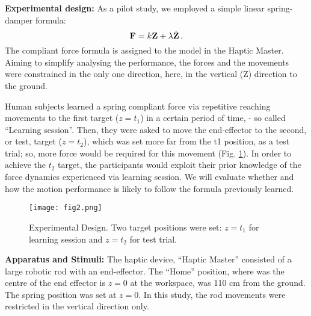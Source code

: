 
\textbf{Experimental design:} As a pilot study, we employed a simple linear spring-damper formula:
%
\begin{equation}
\mathbf{F} = k \mathbf{Z} + \lambda \dot{\mathbf{Z}} \, .
\end{equation}
%
The compliant force formula is assigned to the model in the Haptic Master. Aiming to simplify analysing the performance, the forces and the movements were constrained in the only one direction, here, in the vertical
(Z) direction to the ground.

Human subjects learned a spring compliant force via repetitive reaching movements to the first target ($z = t_1$) in a certain period of time, - so called ``Learning session''. Then, they were asked to move the end-effector to the second, or test, target ($z = t_2$), which was set more far from the t1 position, as a test trial; so, more force would be required for this movement (Fig. \ref*{design}). In order to achieve the $t_2$ target, the participants would exploit their prior knowledge of the force dynamics experienced via learning session. We will evaluate whether and how the motion performance is likely to follow the formula previously learned.
%
\begin{figure}
	\centering
	\texttt{[image: fig2.png]}
	\caption{Experimental Design. Two target positions were set: $z = t_1$ for learning session and $z = t_2$ for test trial.}
	\label{design}
\end{figure}



\textbf{Apparatus and Stimuli:} The haptic device, ``Haptic Master'' consisted of a large robotic rod with an end-effector. The ``Home'' position, where was the centre of the end effector is $z = 0$ at the workspace, was 110 cm from the ground. The spring position was set at $z = 0$. In this study, the rod movements were restricted in the vertical direction only.

